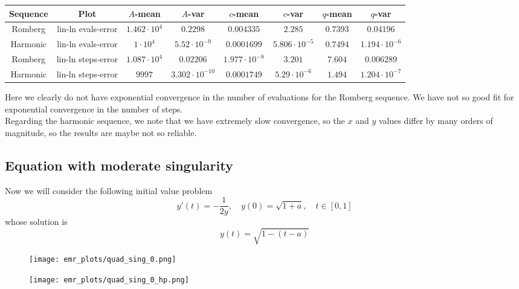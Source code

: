 \begin{table}[H]
    \centering
    \small
     \begin{tabular}{c|c||c|c|c|c|c|c}
Sequence & Plot & \(A\)-mean & \(A\)-var & \(c\)-mean & \(c\)-var & \(q\)-mean & \(q\)-var\\\hline
Romberg & lin-ln evals-error & \(1.462\cdot 10^4\) & \(0.2298\) & \(0.004335\) & \(2.285\) & \(0.7393\) & \(0.04196\) \\
Harmonic & lin-ln evals-error & \(1\cdot 10^4\) & \(5.52\cdot 10^{-9}\) & \(0.0001699\) & \(5.806\cdot 10^{-5}\) & \(0.7494\) & \(1.194\cdot 10^{-6}\) \\
Romberg & lin-ln steps-error & \(1.087\cdot 10^4\) & \(0.02206\) & \(1.977\cdot 10^{-8}\) & \(3.201\) & \(7.604\) & \(0.006289\) \\
Harmonic & lin-ln steps-error & \(9997\) & \(3.302\cdot 10^{-10}\) & \(0.0001749\) & \(5.29\cdot 10^{-6}\) & \(1.494\) & \(1.204\cdot 10^{-7}\) \\
    \end{tabular}
    \label{tab:my_label}
\end{table}

Here we clearly do not have exponential convergence in the number of evaluations for the Romberg sequence. We have not so good fit for exponential convergence in the number of steps.\\

Regarding the harmonic sequence, we note that we have extremely slow convergence, so the \(x\) and \(y\) values differ by many orders of magnitude, so the results are maybe not so reliable.

\subsection{Equation with moderate singularity}

Now we will consider the following initial value problem
\begin{equation}
y'(t) = -\frac{1}{2y}, \quad y(0) = \sqrt{1+a},\quad t\in [0,1]\label{47}
\end{equation}
whose solution is 
\[
y(t) = \sqrt{1 - (t-a)}
\]

\begin{figure}[H]
\centering
\begin{minipage}{0.45\textwidth}
\centering
\texttt{[image: emr\_plots/quad\_sing\_0.png]}
\end{minipage}
\begin{minipage}{0.45\textwidth}
\centering
\texttt{[image: emr\_plots/quad\_sing\_0\_hp.png]}
\end{minipage}
\end{figure}

